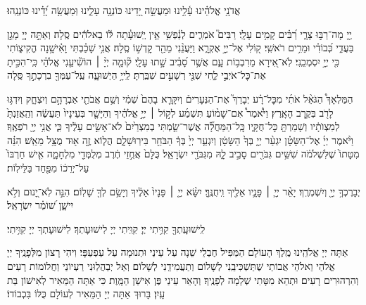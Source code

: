 \begin{small}
	
	אֲדֹנָ֥י אֱלֹהֵ֗ינוּ עָ֫לֵ֥ינוּ וּמַעֲשֵׂ֣ה יָ֭דֵינוּ כּוֹנְנָ֥ה עָלֵ֑ינוּ וּֽמַעֲשֵׂ֥ה יָ֝דֵ֗ינוּ כּוֹנְנֵֽהוּ׃\\
	\tzadialeph
	
	יְ֖יָ מָה־רַבּ֣וּ צָרָ֑י רַ֝בִּ֗ים קָמִ֥ים עָלָֽי׃ רַבִּים֮ אֹמְרִ֢ים לְנַ֫פְשִׁ֥י אֵ֤ין יְֽשׁוּעָ֓תָה לּ֬וֹ בֵאלֹהִ֬ים סֶֽלָה׃ וְאַתָּ֣ה יְיָ֭ מָגֵ֣ן בַּעֲדִ֑י כְּ֝בוֹדִ֗י וּמֵרִ֥ים רֹאשִֽׁי׃ ק֭וֹלִי אֶל־יְיָ֣ אֶקְרָ֑א וַיַּעֲנֵ֨נִי מֵהַ֖ר קׇדְשׁ֣וֹ סֶֽלָה׃ אֲנִ֥י שָׁכַ֗בְתִּי וָאִ֫ישָׁ֥נָה הֱקִיצ֑וֹתִי כִּ֖י יְיָ֣ יִסְמְכֵֽנִי׃ לֹֽא־אִ֭ירָא מֵרִבְב֥וֹת עָ֑ם אֲשֶׁ֥ר סָ֝בִ֗יב שָׁ֣תוּ עָלָֽי׃ ק֘וּמָ֤ה יְיָ֨ ׀ הוֹשִׁ֘יעֵ֤נִי אֱלֹהַ֗י כִּֽי־הִכִּ֣יתָ אֶת־כׇּל־אֹיְבַ֣י לֶ֑חִי שִׁנֵּ֖י רְשָׁעִ֣ים שִׁבַּֽרְתָּ׃ לַֽייָ֥ הַיְשׁוּעָ֑ה עַֽל־עַמְּךָ֖ בִרְכָתֶ֣ךָ סֶּֽלָה
	
	\hashkiveinu{}
	
	\barukhbayom
	
	\yerueinnu
	
	הַמַּלְאָךְ֩ הַגֹּאֵ֨ל אֹתִ֜י מִכׇּל־רָ֗ע יְבָרֵךְ֮ אֶת־הַנְּעָרִים֒ וְיִקָּרֵ֤א בָהֶם֙ שְׁמִ֔י וְשֵׁ֥ם אֲבֹתַ֖י אַבְרָהָ֣ם וְיִצְחָ֑ק וְיִדְגּ֥וּ לָרֹ֖ב בְּקֶ֥רֶב הָאָֽרֶץ׃
	וַיֹּ֩אמֶר֩ אִם־שָׁמ֨וֹעַ תִּשְׁמַ֜ע לְק֣וֹל ׀ יְיָ֣ אֱלֹהֶ֗יךָ וְהַיָּשָׁ֤ר בְּעֵינָיו֙ תַּעֲשֶׂ֔ה וְהַֽאֲזַנְתָּ֙ לְמִצְוֺתָ֔יו וְשָׁמַרְתָּ֖ כׇּל־חֻקָּ֑יו כׇּֽל־הַמַּחֲלָ֞ה אֲשֶׁר־שַׂ֤מְתִּי בְמִצְרַ֙יִם֙ לֹא־אָשִׂ֣ים עָלֶ֔יךָ כִּ֛י אֲנִ֥י יְיָ֖ רֹפְאֶֽךָ׃
	וַיֹּ֨אמֶר יְיָ֜ אֶל־הַשָּׂטָ֗ן יִגְעַ֨ר יְיָ֤ בְּךָ֙ הַשָּׂטָ֔ן וְיִגְעַ֤ר יְיָ֙ בְּךָ֔ הַבֹּחֵ֖ר בִּירֽוּשָׁלָ֑‍ִם הֲל֧וֹא זֶ֦ה א֖וּד מֻצָּ֥ל מֵאֵֽשׁ׃
	הִנֵּ֗ה מִטָּתוֹ֙ שֶׁלִּשְׁלֹמֹ֔ה שִׁשִּׁ֥ים גִּבֹּרִ֖ים סָבִ֣יב לָ֑הּ מִגִּבֹּרֵ֖י יִשְׂרָאֵֽל׃ כֻּלָּם֙ אֲחֻ֣זֵי חֶ֔רֶב מְלֻמְּדֵ֖י מִלְחָמָ֑ה אִ֤ישׁ חַרְבּוֹ֙ עַל־יְרֵכ֔וֹ מִפַּ֖חַד בַּלֵּילֽוֹת׃
	
	יְבָרֶכְךָ֥ יְיָ֖ וְיִשְׁמְרֶֽךָ׃ יָאֵ֨ר יְיָ֧ ׀ פָּנָ֛יו אֵלֶ֖יךָ וִֽיחֻנֶּֽךָּ׃ יִשָּׂ֨א יְיָ֤ ׀ פָּנָיו֙ אֵלֶ֔יךָ וְיָשֵׂ֥ם לְךָ֖ שָׁלֽוֹם׃
	הִנֵּ֣ה לֹֽא־יָ֭נוּם וְלֹ֣א יִישָׁ֑ן שׁ֝וֹמֵ֗ר יִשְׂרָאֵֽל׃
	
	לִֽישׁוּעָֽתְךָ֖ קִוִּ֥יתִי יְיָ׃ קִוִּֽיתִי יְיָ לִישׁוּעָתְךָ׃ לִישׁוּעָתְךָ יְיָ קִוִּ֥יתִי׃
	
	\adonolam
\end{small}

אַתָּה יְיָ אֱלֹהֵֽינוּ מֶֽלֶךְ הָעוֹלָם הַמַּפִּיל חֶבְלֵי שֵׁנָה עַל עֵינַי וּתְנוּמָה עַל עַפְעַפָּי׃ וִיהִי רָצוֹן מִלְּפָנֶֽיךָ יְיָ אֱלֹהַי וֵאלֹהֵי אֲבוֹתַי שֶׁתַּשְׁכִּיבֵֽנִי לְשָׁלוֹם וְתַעֲמִידֵֽנִי לְשָׁלוֹם׃ וְאַל יְבַהֲלֽוּנִי רַעְיוֹנַי וַחֲלוֹמוֹת רָעִים וְהִרְהוּרִים רָעִים׃ וּתְהֵא מִטָּתִי שְׁלֵמָה לְפָנֶֽיךָ׃ וְהָאֵר עֵינַי פֶּן אִישַׁן הַמָּֽוֶת׃ כִּי אַתָּה הַמֵּאִיר לְאִישׁוֹן בַּת עָֽיִן׃ בָּרוּךְ אַתָּה יְיָ הַמֵּאִיר לְעוֹלָם כֻּלּוֹ בִּכְבוֹדוֹ׃
